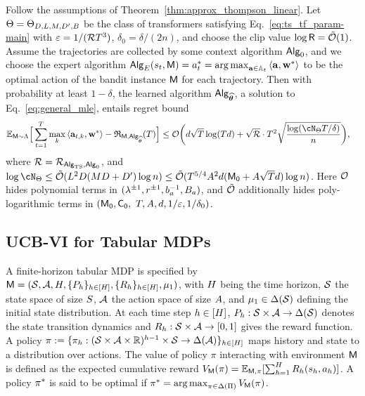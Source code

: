 \begin{theorem}
\label{thm:ts_linear_regret}
Follow the assumptions of Theorem~\ref{thm:approx_thompson_linear}. Let $\Theta = \Theta_{D, L, M, {D'}, B}$ be the class of transformers satisfying Eq.~\eqref{eq:ts_tf_param-main} with $\varepsilon=1/({\mathcal{R}}{T}^3)$,   $\delta_0=\delta/(2n)$, and choose the clip value $\log {\mathsf{R}} = {\tilde{\mathcal O}}(1)$. Assume the trajectories are collected by some context algorithm ${\mathsf{Alg}}_0$, and we choose the expert algorithm ${\mathsf{Alg}}_{E}({s}_t,{\mathsf{M}})={a}^*_t=\operatorname*{arg\,max}_{{\mathbf a}\in{\mathbb{A}}_t}\left\langle{\mathbf a},{\mathbf w}^*\right\rangle$ to be the optimal action of the bandit instance ${\mathsf{M}}$ for each trajectory. Then with probability at least $1-\delta$, the learned algorithm ${\mathsf{Alg}}_{{\widehat{{\boldsymbol \theta}}}}$, a solution to Eq.~\eqref{eq:general_mle}, entails regret bound
\begin{align*}
\E_{\inst\sim\prior}\Big[\sum_{t=1}^\totlen\max_{k}\<\ba_{t,k},\bw^*\>-\totreward_{\inst,\sAlg_\esttfpar}(\totlen)\Big]&\leq \cO \bigg( d\sqrt{T}\log(Td)+ \sqrt{\distratio} \cdot\totlen^2\sqrt{\frac{\log ( \cN_{\Parspace} \totlen/\delta ) }{n} } \bigg),
\end{align*}
where ${\mathcal{R}} = {\mathcal{R}}_{{\mathsf{Alg}}_{\mathrm{TS}},{\mathsf{Alg}}_0}$, and $\log \cN_{\Parspace} \le \tcO(\layer^2\embd(\head\embd+\hidden)\log \Numobs )  \leq\tcO(\totlen^{5/4}\Numact^2 d(\neuron+\Numact\sqrt{\totlen}d)\log\Numobs)$. Here $\mathcal{O}$ hides polynomial terms in $({\lambda}^{\pm1}, {r}^{\pm1}, b_a^{-1}, B_a)$, and ${\tilde{\mathcal O}}$ additionally hides poly-logarithmic terms in   $({\mathsf{M_0}},{{\mathsf{C_0}}},\\~ {T}, {A}, d, 1/\varepsilon, 1/\delta_0)$.
\end{theorem}




\subsection{UCB-VI for Tabular MDPs}\label{sec:Tabular-MDP-statement}


A finite-horizon tabular MDP is specified by ${\mathsf{M}}=({\mathcal{S}},{\mathcal{A}}, {H}, \{{P}_h\}_{h\in[{H}]},\{{R}_h\}_{h\in[{H}]},{\mu_1})$, with ${H}$ being the time horizon, ${\mathcal{S}}$ the state space of size ${S}$, ${\mathcal{A}}$ the action space of size ${A}$, and ${\mu_1}\in\Delta({\mathcal{S}})$ defining the initial state distribution. At each time step $h\in[{H}]$, ${P}_h: {\mathcal{S}}\times{\mathcal{A}} \to \Delta({\mathcal{S}})$ denotes the state transition dynamics and ${R}_h:{\mathcal{S}} \times {\mathcal{A}} \to [0,1]$ gives the reward function. A policy ${\pi}:=\{{\pi}_h:({\mathcal{S}} \times{\mathcal{A}} \times \mathbb{R})^{h-1}\times{\mathcal{S}} \to\Delta({\mathcal{A}})\}_{h \in [{H}]}$ maps history and state to a distribution over actions. The value of policy $\pi$ interacting with environment ${\mathsf{M}}$ is defined as the expected cumulative reward ${V}_{\mathsf{M}}({\pi})=\mathbb{E}_{{\mathsf{M}},{\pi}}[\sum_{h=1}^{H} {R}_h ({s}_h,{a}_h)]$. A policy ${\pi^*}$ is said to be optimal if ${\pi^*}=\operatorname*{arg\,max}_{\pi\in\Delta({\Pi})}{V}_{\mathsf{M}}(\pi)$.


